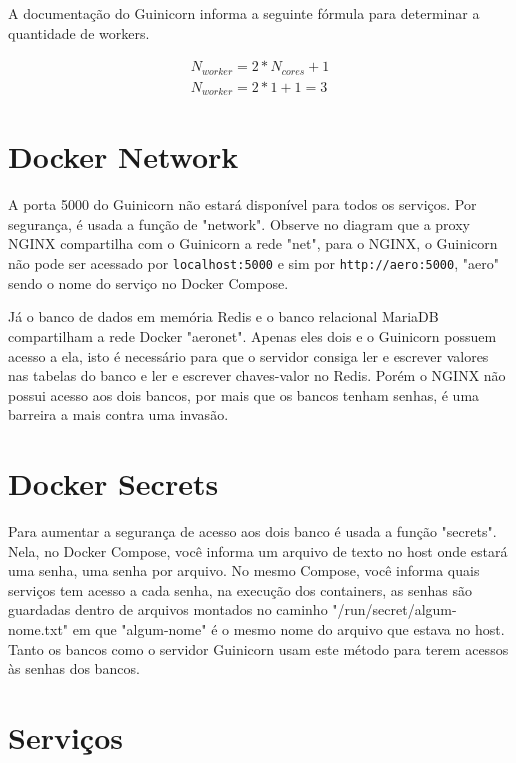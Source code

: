 A documentação do Guinicorn informa a seguinte fórmula para determinar a quantidade de workers. \cite{number-work}

\begin{equation} 
    \begin{split}
        N_{worker} = 2 * N_{cores} + 1 \\
        N_{worker} = 2 * 1 + 1 = 3 
    \end{split}
\end{equation}

\section{Docker Network}
A porta 5000 do Guinicorn não estará disponível para todos os serviços. Por segurança, é usada a função de
"network". Observe no diagram que a proxy NGINX compartilha com o Guinicorn a rede "net", para o NGINX,
o Guinicorn não pode ser acessado por \texttt{localhost:5000} e sim por \texttt{http://aero:5000}, "aero"
sendo o nome do serviço no Docker Compose.

Já o banco de dados em memória Redis e o banco relacional MariaDB compartilham a rede Docker "aeronet".
Apenas eles dois e o Guinicorn possuem acesso a ela, isto é necessário para que o servidor consiga ler
e escrever valores nas tabelas do banco e ler e escrever chaves-valor no Redis. Porém o NGINX não possui
acesso aos dois bancos, por mais que os bancos tenham senhas, é uma barreira a mais contra uma invasão.

\section{Docker Secrets}

Para aumentar a segurança de acesso aos dois banco é usada a função "secrets". Nela, no Docker Compose,
você informa um arquivo de texto no host onde estará uma senha, uma senha por arquivo. No mesmo Compose,
você informa quais serviços tem acesso a cada senha, na execução dos containers, as senhas são
guardadas dentro de arquivos montados no caminho "/run/secret/algum-nome.txt" em que "algum-nome" é
o mesmo nome do arquivo que estava no host.
Tanto os bancos como o servidor Guinicorn usam este método para terem acessos às senhas dos bancos.

\section{Serviços}

